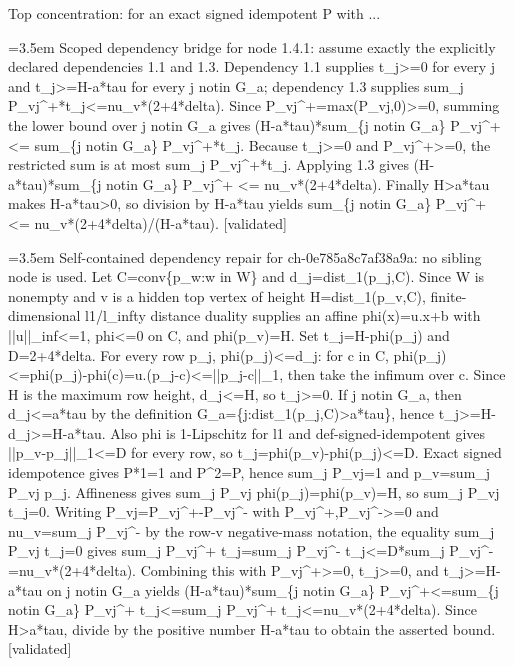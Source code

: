 \documentclass{article}
\newcommand{\step}[1]{\par\noindent\hangindent=3.5em\hangafter=1%
  \makebox[3.5em][l]{\textbf{#1.}}}
\newcommand{\steptag}[1]{\hfill{\small\textsf{[#1]}}}
\begin{document}
\begin{proofbox}{Top concentration: for an exact signed idempotent P with ...}
\step{1.4.1.2} Scoped dependency bridge for node 1.4.1: assume exactly the explicitly declared dependencies 1.1 and 1.3. Dependency 1.1 supplies t\_j>=0 for every j and t\_j>=H-a*tau for every j notin G\_a; dependency 1.3 supplies sum\_j P\_vj\textasciicircum{}+*t\_j<=nu\_v*(2+4*delta). Since P\_vj\textasciicircum{}+=max(P\_vj,0)>=0, summing the lower bound over j notin G\_a gives (H-a*tau)*sum\_\{j notin G\_a\} P\_vj\textasciicircum{}+ <= sum\_\{j notin G\_a\} P\_vj\textasciicircum{}+*t\_j. Because t\_j>=0 and P\_vj\textasciicircum{}+>=0, the restricted sum is at most sum\_j P\_vj\textasciicircum{}+*t\_j. Applying 1.3 gives (H-a*tau)*sum\_\{j notin G\_a\} P\_vj\textasciicircum{}+ <= nu\_v*(2+4*delta). Finally H>a*tau makes H-a*tau>0, so division by H-a*tau yields sum\_\{j notin G\_a\} P\_vj\textasciicircum{}+ <= nu\_v*(2+4*delta)/(H-a*tau). \steptag{validated} \\[4pt]
\step{1.4.1.3} Self-contained dependency repair for ch-0e785a8c7af38a9a: no sibling node is used. Let C=conv\{p\_w:w in W\} and d\_j=dist\_1(p\_j,C). Since W is nonempty and v is a hidden top vertex of height H=dist\_1(p\_v,C), finite-dimensional l1/l\_infty distance duality supplies an affine phi(x)=u.x+b with ||u||\_inf<=1, phi<=0 on C, and phi(p\_v)=H. Set t\_j=H-phi(p\_j) and D=2+4*delta. For every row p\_j, phi(p\_j)<=d\_j: for c in C, phi(p\_j)<=phi(p\_j)-phi(c)=u.(p\_j-c)<=||p\_j-c||\_1, then take the infimum over c. Since H is the maximum row height, d\_j<=H, so t\_j>=0. If j notin G\_a, then d\_j<=a*tau by the definition G\_a=\{j:dist\_1(p\_j,C)>a*tau\}, hence t\_j>=H-d\_j>=H-a*tau. Also phi is 1-Lipschitz for l1 and def-signed-idempotent gives ||p\_v-p\_j||\_1<=D for every row, so t\_j=phi(p\_v)-phi(p\_j)<=D. Exact signed idempotence gives P*1=1 and P\textasciicircum{}2=P, hence sum\_j P\_vj=1 and p\_v=sum\_j P\_vj p\_j. Affineness gives sum\_j P\_vj phi(p\_j)=phi(p\_v)=H, so sum\_j P\_vj t\_j=0. Writing P\_vj=P\_vj\textasciicircum{}+-P\_vj\textasciicircum{}- with P\_vj\textasciicircum{}+,P\_vj\textasciicircum{}->=0 and nu\_v=sum\_j P\_vj\textasciicircum{}- by the row-v negative-mass notation, the equality sum\_j P\_vj t\_j=0 gives sum\_j P\_vj\textasciicircum{}+ t\_j=sum\_j P\_vj\textasciicircum{}- t\_j<=D*sum\_j P\_vj\textasciicircum{}-=nu\_v*(2+4*delta). Combining this with P\_vj\textasciicircum{}+>=0, t\_j>=0, and t\_j>=H-a*tau on j notin G\_a yields (H-a*tau)*sum\_\{j notin G\_a\} P\_vj\textasciicircum{}+<=sum\_\{j notin G\_a\} P\_vj\textasciicircum{}+ t\_j<=sum\_j P\_vj\textasciicircum{}+ t\_j<=nu\_v*(2+4*delta). Since H>a*tau, divide by the positive number H-a*tau to obtain the asserted bound. \steptag{validated} \\[4pt]
\end{proofbox}
\end{document}
